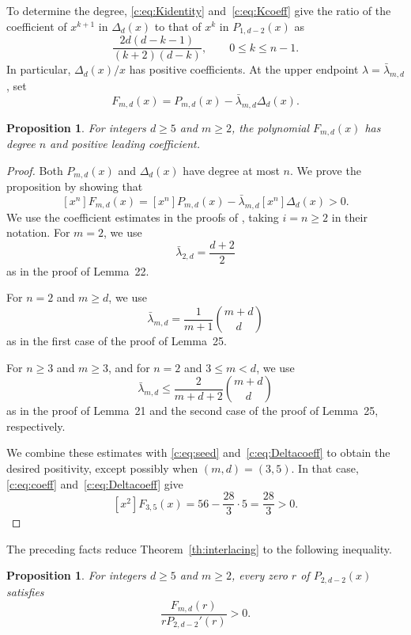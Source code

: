 \documentclass[11pt]{article}
\numberwithin{equation}{section}
\newtheorem{proposition}[theorem]{Proposition}
\theoremstyle{remark}\newtheorem{remark}[theorem]{Remark}
\begin{document}
To determine the degree, \eqref{c:eq:Kidentity} and~\eqref{c:eq:Kcoeff}
give the ratio of the coefficient of $x^{k+1}$ in $\Delta_d(x)$ to that
of $x^k$ in $P_{1,d-2}(x)$ as
\begin{equation}\label{c:eq:Deltacoeff}
 \frac{2d(d-k-1)}{(k+2)(d-k)},\qquad 0\le k\le n-1.
\end{equation}
In particular, $\Delta_d(x)/x$ has positive coefficients.
At the upper endpoint $\lambda=\bar\lambda_{m,d}$, set
\[
 F_{m,d}(x)=P_{m,d}(x)-\bar\lambda_{m,d}\Delta_d(x).
\]
\begin{proposition}\label{c:prop:leading}
For integers $d\ge5$ and $m\ge2$, the polynomial $F_{m,d}(x)$ has
degree $n$ and positive leading coefficient.
\end{proposition}
\begin{proof}
Both $P_{m,d}(x)$ and $\Delta_d(x)$ have degree at most $n$.
We prove the proposition by showing that
\[
 [x^n]F_{m,d}(x)
 =[x^n]P_{m,d}(x)-\bar\lambda_{m,d}[x^n]\Delta_d(x)>0.
\]
We use the coefficient estimates in the proofs of
\cite[Lemmas~21, 22, and~25]{LNR}, taking $i=n\ge2$ in their notation.
For $m=2$, we use
\[
 \bar\lambda_{2,d}=\frac{d+2}{2}
\]
as in the proof of Lemma~22.

For $n=2$ and $m\ge d$, we use
\[
 \bar\lambda_{m,d}=\frac{1}{m+1}\binom{m+d}{d}
\]
as in the first case of the proof of Lemma~25.

For $n\ge3$ and $m\ge3$, and for $n=2$ and $3\le m<d$,
we use
\[
 \bar\lambda_{m,d}\le\frac{2}{m+d+2}\binom{m+d}{d}
\]
as in the proof of Lemma~21 and the second case of the proof of
Lemma~25, respectively.

We combine these estimates with \eqref{c:eq:seed}
and~\eqref{c:eq:Deltacoeff} to obtain the desired positivity,
except possibly when $(m,d)=(3,5)$.
In that case, \eqref{c:eq:coeff} and~\eqref{c:eq:Deltacoeff} give
\[
 [x^2]F_{3,5}(x)=56-\frac{28}{3}\cdot5=\frac{28}{3}>0.
\]
\end{proof}

The preceding facts reduce Theorem~\ref{th:interlacing} to the following
inequality.

\begin{proposition}\label{c:prop:endpoint}
For integers $d\ge5$ and $m\ge2$, every zero $r$ of $P_{2,d-2}(x)$ satisfies
\begin{equation}\label{c:eq:endpointnodes}
 \frac{F_{m,d}(r)}{rP_{2,d-2}'(r)}>0.
\end{equation}
\end{proposition}
\end{document}
